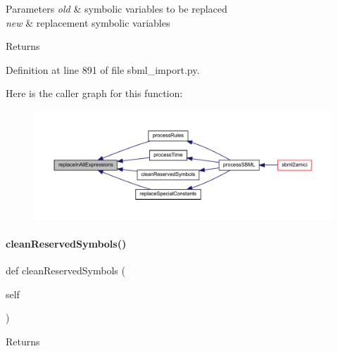 \begin{DoxyParams}{Parameters}
{\em old} & symbolic variables to be replaced \\
\hline
{\em new} & replacement symbolic variables\\
\hline
\end{DoxyParams}
\begin{DoxyReturn}{Returns}

\end{DoxyReturn}


Definition at line 891 of file sbml\+\_\+import.\+py.

Here is the caller graph for this function\+:
\nopagebreak
\begin{figure}[H]
\begin{center}
\leavevmode
\includegraphics[width=350pt]{classamici_1_1sbml__import_1_1_sbml_importer_a1579faf8b188de11ed58ddbebc3c20a7_icgraph}
\end{center}
\end{figure}
\mbox{\label{classamici_1_1sbml__import_1_1_sbml_importer_a122b9921e2fb5bd0fc75310c47413dd1}} 
\paragraph{\texorpdfstring{clean\+Reserved\+Symbols()}{cleanReservedSymbols()}}
{\footnotesize\ttfamily def clean\+Reserved\+Symbols (\begin{DoxyParamCaption}\item[{}]{self }\end{DoxyParamCaption})}

\begin{DoxyReturn}{Returns}

\end{DoxyReturn}



